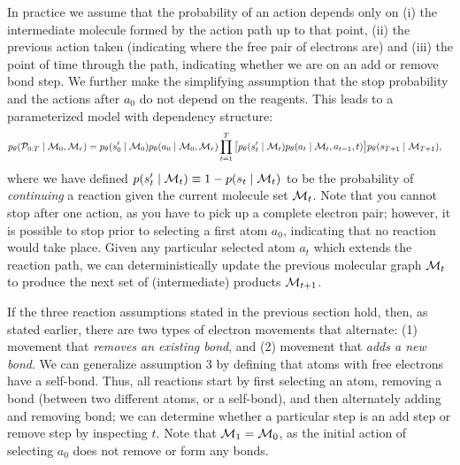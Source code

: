 In practice we assume that the probability of an action depends only on (i) the intermediate molecule formed by the action path up to that point, (ii) the previous action taken (indicating where the free pair of electrons are) and (iii) the point of time through the path, indicating whether we are on an add or remove bond step. 
We further make the simplifying assumption that the stop probability and the actions after $a_0$ do not depend on the reagents. This leads to a parameterized model with dependency structure:
\begin{align}
p_\theta({\mathcal{P}}_{0:T} \mid {\mathcal{M}}_0, {\mathcal{M}}_r) 
&=
	   p_\theta(s'_0 \mid {\mathcal{M}}_0)
       p_\theta(a_0 \mid {\mathcal{M}}_0, {\mathcal{M}}_r)
\prod_{t=1}^{T}
	\big[ 
		p_\theta(s_{t}' \mid {\mathcal{M}}_{t})
		p_\theta(a_t \mid {\mathcal{M}}_{t}, a_{t-1}, t)
	\big]
	p_\theta(s_{T+1} \mid {\mathcal{M}}_{T+1})
	,
\label{eq:jointprob}
\end{align}
where we have defined $p(s'_t \mid {\mathcal{M}}_t) \equiv 1 - p(s_t \mid {\mathcal{M}}_t)$ to be the probability of {\em continuing} a reaction given the current molecule set ${\mathcal{M}}_t$.
%
%
%
Note that you cannot stop after one action, as you have to pick up a complete electron pair;
however, it is possible to stop prior to selecting a first atom $a_0$, indicating that no reaction would take place.
Given any particular selected atom $a_t$ which extends the reaction path, we can deterministically update the previous molecular graph ${\mathcal{M}}_{t}$ to produce the next set of (intermediate) products ${\mathcal{M}}_{t+1}$.

If the three reaction assumptions stated in the previous section hold, then, as stated earlier, there are two types of electron movements that alternate: 
(1) movement that \emph{removes an existing bond}, and 
(2) movement that \emph{adds a new bond}. 
We can generalize assumption 3 by defining that atoms with free electrons have a self-bond. 
Thus, all reactions start by first selecting an atom, removing a bond (between two different atoms, or a self-bond), and then alternately adding and removing bond;
we can determine whether a particular step is an add step or remove step by inspecting $t$.
Note that ${\mathcal{M}}_1 = {\mathcal{M}}_0$, as the initial action of selecting $a_0$ does not remove or form any bonds.

